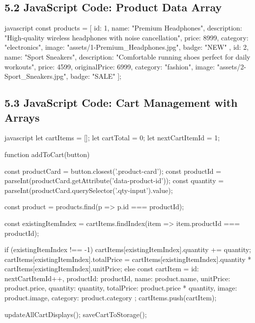 \documentclass[a4paper,12pt]{article}
\begin{document}
\subsection*{5.2 JavaScript Code: Product Data Array}
\begin{code}[fontsize=\small]{javascript}
  const products = [
  {
      id: 1,
      name: "Premium Headphones",
      description: "High-quality wireless headphones with noise cancellation",
      price: 8999,
      category: "electronics",
      image: "assets/1-Premium_Headphones.jpg",
      badge: "NEW"
    },
  {
      id: 2,
      name: "Sport Sneakers",
      description: "Comfortable running shoes perfect for daily workouts",
      price: 4599,
      originalPrice: 6999,
      category: "fashion",
      image: "assets/2-Sport_Sneakers.jpg",
      badge: "SALE"
    }
  ];
\end{code}

\subsection*{5.3 JavaScript Code: Cart Management with Arrays}
\begin{code}[fontsize=\small]{javascript}
  let cartItems = [];
  let cartTotal = 0;
  let nextCartItemId = 1;

  function addToCart(button) {
      const productCard = button.closest('.product-card');
      const productId = parseInt(productCard.getAttribute('data-product-id'));
      const quantity = parseInt(productCard.querySelector('.qty-input').value);

      const product = products.find(p => p.id === productId);

      const existingItemIndex = cartItems.findIndex(item => item.productId === productId);

      if (existingItemIndex !== -1) {
          cartItems[existingItemIndex].quantity += quantity;
          cartItems[existingItemIndex].totalPrice =
          cartItems[existingItemIndex].quantity * cartItems[existingItemIndex].unitPrice;
        } else {
          const cartItem = {
              id: nextCartItemId++,
              productId: productId,
              name: product.name,
              unitPrice: product.price, quantity: quantity,
              totalPrice: product.price * quantity,
              image: product.image, category: product.category
            };
          cartItems.push(cartItem);
        }

      updateAllCartDisplays();
      saveCartToStorage();
    }
\end{code}
\end{document}
